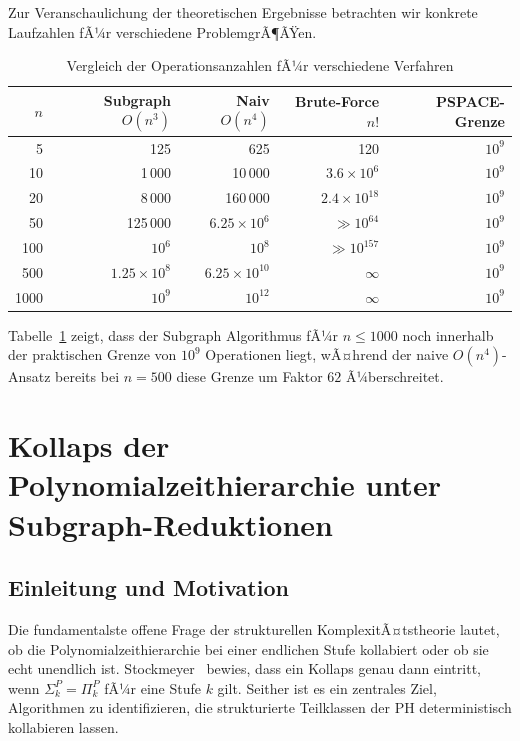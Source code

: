 ﻿\documentclass[a4paper,12pt]{article}
\theoremstyle{definition}
\begin{document}
Zur Veranschaulichung der theoretischen Ergebnisse betrachten wir
konkrete Laufzahlen fÃ¼r verschiedene ProblemgrÃ¶ÃŸen.

\begin{table}[htbp]
  \centering
  \caption{Vergleich der Operationsanzahlen fÃ¼r verschiedene Verfahren}
  \label{tab:ops}
  \begin{tabular}{r r r r r}
    \toprule
    $n$ & Subgraph $O(n^3)$ & Naiv $O(n^4)$ & Brute-Force $n!$ & PSPACE-Grenze \\
    \midrule
    5   & 125       & 625         & 120         & $10^9$ \\
    10  & 1\,000    & 10\,000     & $3.6 \times 10^6$  & $10^9$ \\
    20  & 8\,000    & 160\,000    & $2.4 \times 10^{18}$ & $10^9$ \\
    50  & 125\,000  & $6.25 \times 10^6$ & $\gg 10^{64}$ & $10^9$ \\
    100 & $10^6$    & $10^8$      & $\gg 10^{157}$ & $10^9$ \\
    500 & $1.25 \times 10^8$ & $6.25 \times 10^{10}$ & $\infty$ & $10^9$ \\
    1000& $10^9$    & $10^{12}$   & $\infty$    & $10^9$ \\
    \bottomrule
  \end{tabular}
\end{table}

Tabelle~\ref{tab:ops} zeigt, dass der Subgraph Algorithmus fÃ¼r
$n \leq 1000$ noch innerhalb der praktischen Grenze von $10^9$ Operationen liegt,
wÃ¤hrend der naive $O(n^4)$-Ansatz bereits bei $n = 500$ diese Grenze um
Faktor $62$ Ã¼berschreitet.

\section{Kollaps der Polynomialzeithierarchie unter Subgraph-Reduktionen}
\label{sec:kollaps}

\subsection{Einleitung und Motivation}

Die fundamentalste offene Frage der strukturellen KomplexitÃ¤tstheorie lautet,
ob die Polynomialzeithierarchie bei einer endlichen Stufe kollabiert oder ob sie
echt unendlich ist. Stockmeyer~\cite{stockmeyer1976poly} bewies, dass ein Kollaps
genau dann eintritt, wenn $\Sigma_k^P = \Pi_k^P$ fÃ¼r eine Stufe $k$ gilt.
Seither ist es ein zentrales Ziel, Algorithmen zu identifizieren, die
strukturierte Teilklassen der PH deterministisch kollabieren lassen.
\end{document}

